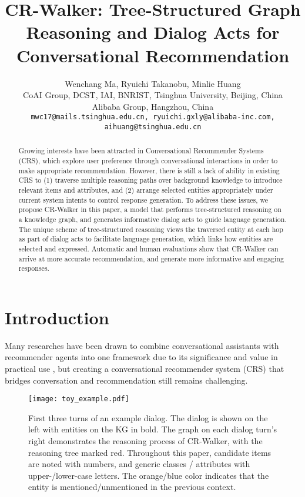 \documentclass[11pt]{article}
\title{CR-Walker: Tree-Structured Graph Reasoning and Dialog Acts for Conversational Recommendation}
\author{Wenchang Ma, Ryuichi Takanobu, Minlie Huang\\
CoAI Group, DCST, IAI, BNRIST, Tsinghua University, Beijing, China\\
Alibaba Group, Hangzhou, China\\
{\small \tt mwc17@mails.tsinghua.edu.cn, ryuichi.gxly@alibaba-inc.com, aihuang@tsinghua.edu.cn}
}
\begin{document}
\maketitle
\begin{abstract}
Growing interests have been attracted in Conversational Recommender Systems (CRS), which explore user preference through conversational interactions in order to make appropriate recommendation. However, there is still a lack of ability in existing CRS to (1) traverse multiple reasoning paths over background knowledge to introduce relevant items and attributes, and (2) arrange selected entities appropriately under current system intents to control response generation. To address these issues, we propose CR-Walker in this paper, a model that performs tree-structured reasoning on a knowledge graph, and generates informative dialog acts to guide language generation. The unique scheme of tree-structured reasoning views the traversed entity at each hop as part of dialog acts to facilitate language generation, which links how entities are selected and expressed.  Automatic and human evaluations show that CR-Walker can arrive at more accurate recommendation, and generate more informative and engaging responses.
\end{abstract}
\renewcommand{\thefootnote}{\fnsymbol{footnote}}
\renewcommand{\thefootnote}{\arabic{footnote}}

\section{Introduction}
Many researches have been drawn to combine conversational assistants with recommender agents into one framework due to its significance and value in practical use \cite{sun2018conversational,jannach2020survey}, but creating a conversational recommender system (CRS) that bridges conversation and recommendation still remains challenging. 

\begin{figure}[htb]
    \centering
    \texttt{[image: toy\_example.pdf]}
    \caption{First three turns of an example dialog. The dialog is shown on the left with entities on the KG in bold. The graph on each dialog turn's right demonstrates the reasoning process of CR-Walker, with the reasoning tree marked red. Throughout this paper, candidate items are noted with numbers, and generic classes / attributes with upper-/lower-case letters. The orange/blue color indicates that the entity is mentioned/unmentioned in the previous context.}
    \label{fig:toy} 
\end{figure}
\end{document}
